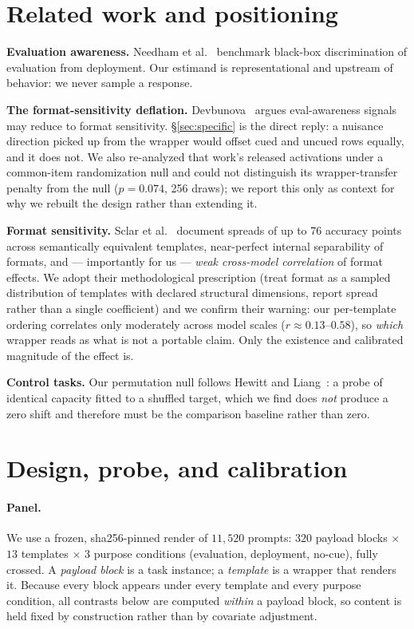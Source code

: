 \documentclass[10pt]{article}
\begin{document}
\section{Related work and positioning}

\textbf{Evaluation awareness.} Needham et al.~\cite{needham2025} benchmark
black-box discrimination of evaluation from deployment. Our estimand is
representational and upstream of behavior: we never sample a response.

\textbf{The format-sensitivity deflation.} Devbunova~\cite{devbunova2026} argues
eval-awareness signals may reduce to format sensitivity.
\S\ref{sec:specific} is the direct reply: a nuisance direction picked up from
the wrapper would offset cued and uncued rows equally, and it does not. We also
re-analyzed that work's released activations under a common-item randomization
null and could not distinguish its wrapper-transfer penalty from the null
($p = 0.074$, 256 draws); we report this only as context for why we rebuilt the
design rather than extending it.

\textbf{Format sensitivity.} Sclar et al.~\cite{sclar2024} document spreads of
up to 76 accuracy points across semantically equivalent templates, near-perfect
internal separability of formats, and --- importantly for us --- \emph{weak
cross-model correlation} of format effects. We adopt their methodological
prescription (treat format as a sampled distribution of templates with declared
structural dimensions, report spread rather than a single coefficient) and we
confirm their warning: our per-template ordering correlates only moderately
across model scales ($r \approx 0.13$--$0.58$), so \emph{which} wrapper reads as
what is not a portable claim. Only the existence and calibrated magnitude of the
effect is.

\textbf{Control tasks.} Our permutation null follows Hewitt and
Liang~\cite{hewitt2019}: a probe of identical capacity fitted to a shuffled
target, which we find does \emph{not} produce a zero shift and therefore must be
the comparison baseline rather than zero.

\section{Design, probe, and calibration}
\label{sec:design}

\paragraph{Panel.} We use a frozen, sha256-pinned render of $11{,}520$ prompts:
$320$ payload blocks $\times$ $13$ templates $\times$ $3$ purpose conditions
(evaluation, deployment, no-cue), fully crossed. A \emph{payload block} is a
task instance; a \emph{template} is a wrapper that renders it. Because every
block appears under every template and every purpose condition, all contrasts
below are computed \emph{within} a payload block, so content is held fixed by
construction rather than by covariate adjustment.
\end{document}
